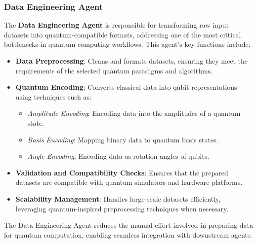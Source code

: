 \documentclass[12pt]{article}
\begin{document}
\subsubsection{Data Engineering Agent}
The \textbf{Data Engineering Agent} is responsible for transforming raw input datasets into quantum-compatible formats, addressing one of the most critical bottlenecks in quantum computing workflows. This agent's key functions include:
\begin{itemize}
    \item \textbf{Data Preprocessing}: Cleans and formats datasets, ensuring they meet the requirements of the selected quantum paradigms and algorithms.
    \item \textbf{Quantum Encoding}: Converts classical data into qubit representations using techniques such as:
    \begin{itemize}
        \item \textit{Amplitude Encoding}: Encoding data into the amplitudes of a quantum state.
        \item \textit{Basis Encoding}: Mapping binary data to quantum basis states.
        \item \textit{Angle Encoding}: Encoding data as rotation angles of qubits.
    \end{itemize}
    \item \textbf{Validation and Compatibility Checks}: Ensures that the prepared datasets are compatible with quantum simulators and hardware platforms.
    \item \textbf{Scalability Management}: Handles large-scale datasets efficiently, leveraging quantum-inspired preprocessing techniques when necessary.
\end{itemize}
The Data Engineering Agent reduces the manual effort involved in preparing data for quantum computation, enabling seamless integration with downstream agents.
\end{document}
